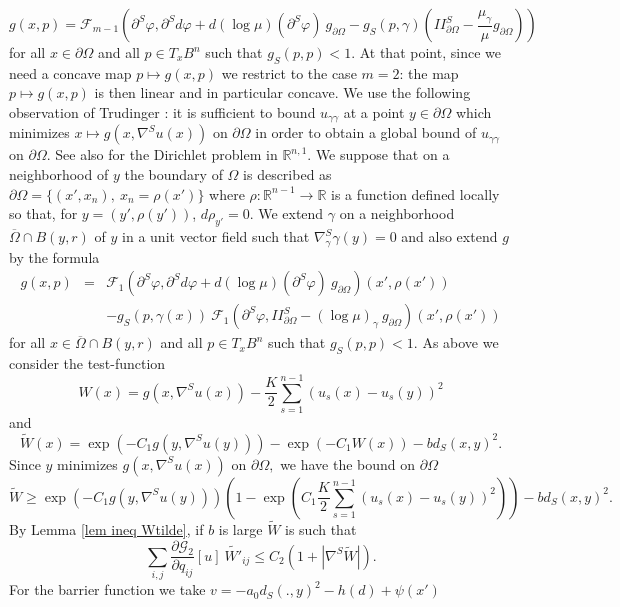 \documentclass[10pt,reqno,oneside]{amsart}
\theoremstyle{definition}
\theoremstyle{remark}
\newcommand{\R}{\mathbb{R}}
\begin{document}
\begin{equation*}
g(x,p)= \mathcal{F}_{m-1}\left(\partial^S\varphi,\partial^Sd\varphi+d(\log\mu)(\partial^S\varphi)\ g_{\partial\Omega}-g_S(p,\gamma)\left(II^S_{\partial\Omega}-\frac{\mu_\gamma}{\mu}g_{\partial\Omega}\right)\right)
\end{equation*}
for all $x\in\partial\Omega$ and all $p\in T_xB^n$ such that $g_S(p,p)<1.$ At that point, since we need a concave map $p\mapsto g(x,p)$ we restrict to the case $m=2$: the map $p\mapsto g(x,p)$ is then linear and in particular concave. We use the following observation of Trudinger \cite{ILT,Tr95}:  it is sufficient to bound $u_{\gamma\gamma}$ at a point $y\in\partial\Omega$ which minimizes $x\mapsto g(x,\nabla^Su(x))$ on $\partial\Omega$ in order to obtain a global bound of $u_{\gamma\gamma}$ on $\partial\Omega$. See also \cite{Bay1} for the Dirichlet problem in $\R^{n,1}.$ We suppose that on a neighborhood of $y$ the boundary of $\Omega$ is described as $\partial\Omega=\{(x',x_n),\ x_n=\rho(x')\}$ where $\rho:\R^{n-1}\rightarrow\R$ is a function defined locally so that, for $y=(y',\rho(y'))$, $d\rho_{y'}=0$. We extend $\gamma$ on a neighborhood $\overline{\Omega}\cap B(y,r)$ of $y$ in a unit vector field such that $\nabla^S_{\gamma}\gamma(y)=0$ and also extend $g$ by the formula 
\begin{eqnarray}
g(x,p)&=& \mathcal{F}_{1}\left(\partial^S\varphi,\partial^Sd\varphi+d(\log\mu)(\partial^S\varphi)\ g_{\partial\Omega}\right)(x',\rho(x'))\label{def g estC2b nn ext}\\
&&-g_S(p,\gamma(x))\ \mathcal{F}_1\left(\partial^S\varphi,II^S_{\partial\Omega}-(\log\mu)_\gamma\ g_{\partial\Omega}\right)(x',\rho(x'))\nonumber
\end{eqnarray}
for all $x\in \overline{\Omega}\cap B(y,r)$ and all $p\in T_xB^n$ such that $g_S(p,p)<1.$ As above we consider the test-function
$$W(x)=g(x,\nabla^S u(x))-\frac{K}{2}\sum_{s=1}^{n-1}(u_s(x)-u_s(y))^2$$
and
$$\widetilde{W}(x)=\exp\left(-C_1g(y,\nabla^S u(y))\right)-\exp\left(-C_1W(x)\right)-bd_S(x,y)^2.$$
Since $y$ minimizes $g(x,\nabla^Su(x))$ on $\partial\Omega,$ we have the bound on $\partial\Omega$
$$\widetilde{W}\geq \exp\left(-C_1g(y,\nabla^S u(y))\right)\left(1-\exp\left(C_1\frac{K}{2}\sum_{s=1}^{n-1}(u_s(x)-u_s(y))^2\right)\right)-bd_S(x,y)^2.$$
By Lemma \ref{lem ineq Wtilde}, if $b$ is large $\widetilde{W}$ is such that
$$\sum_{i,j}\frac{\partial\mathcal{G}_2}{\partial q_{ij}}[u]\ \widetilde{W'}_{ij}\leq C_2(1+|\nabla^S\widetilde{W}|).$$
For the barrier function we take $v=-a_0d_S(.,y)^2-h(d)+\psi(x')$
\end{document}
